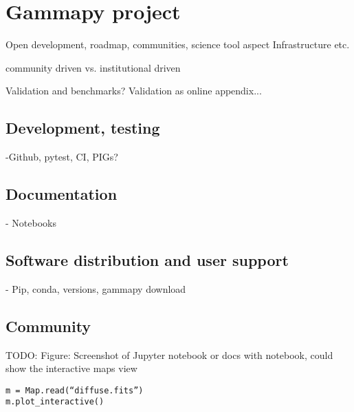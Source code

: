 \section{Gammapy project}
\label{sec:project}

Open development, roadmap, communities, science tool aspect Infrastructure etc.

community driven vs. institutional driven

Validation and benchmarks? Validation as online appendix...

\subsection{Development, testing}

-Github, pytest, CI, PIGs?

\subsection{Documentation}

- Notebooks

\subsection{Software distribution and user support}

- Pip, conda, versions, gammapy download

\subsection{Community}

TODO: Figure: Screenshot of Jupyter notebook or docs with notebook, could show
the interactive maps view
\begin{verbatim}
m = Map.read(“diffuse.fits”)
m.plot_interactive()        
\end{verbatim}
